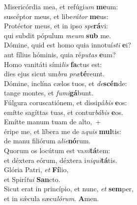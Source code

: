 \evenverse Misericórdia mea, et refúgi\textit{um} \textbf{me}um:~\*\\
\evenverse suscéptor meus, et libe\textit{rá}\textit{tor} \textbf{me}us:\\
\oddverse Protéctor meus, et in ipso \textit{spe}\textbf{rá}vi:~\*\\
\oddverse qui subdit pópulum \textit{me}\textit{um} \textbf{sub} me.\\
\evenverse Dómine, quid est homo quia innotuí\textit{sti} \textbf{e}i?~\*\\
\evenverse aut fílius hóminis, quia ré\textit{pu}\textit{tas} \textbf{e}um?\\
\oddverse Homo vanitáti sími\textit{lis} \textbf{fa}ctus est:~\*\\
\oddverse dies ejus sicut um\textit{bra} \textit{præ}\textbf{té}reunt.\\
\evenverse Dómine, inclína cælos tuos, et \textit{de}\textbf{scén}de:~\*\\
\evenverse tange montes, et \textit{fu}\textit{mi}\textbf{gá}bunt.\\
\oddverse Fúlgura coruscatiónem, et dissipá\textit{bis} \textbf{e}os:~\*\\
\oddverse emítte sagíttas tuas, et contur\textit{bá}\textit{bis} \textbf{e}os.\\
\evenverse Emítte manum tuam de alto,~+\\
\evenverse  éripe me, et líbera me de a\textit{quis} \textbf{mul}tis:~\*\\
\evenverse de manu filiórum a\textit{li}\textit{e}\textbf{nó}rum.\\
\oddverse Quorum os locútum est va\textit{ni}\textbf{tá}tem:~\*\\
\oddverse et déxtera eórum, déxtera i\textit{ni}\textit{qui}\textbf{tá}tis.\\
\evenverse Glória Patri, \textit{et} \textbf{Fí}lio,~\*\\
\evenverse et Spirí\textit{tu}\textit{i} \textbf{San}cto.\\
\oddverse Sicut erat in princípio, et nunc, \textit{et} \textbf{sem}per,~\*\\
\oddverse et in sǽcula sæcu\textit{ló}\textit{rum}. \textbf{A}men.\\
